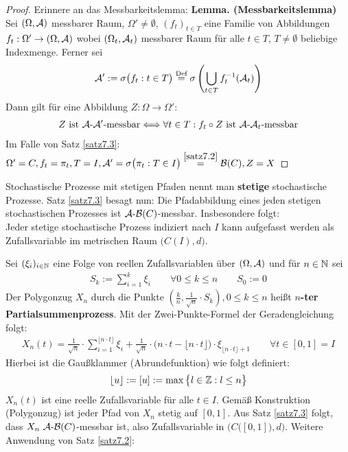 \begin{proof}
	Erinnere an das Messbarkeitslemma:\nl
	\textbf{Lemma. (Messbarkeitslemma)}\\
	Sei $(\Omega,\mathcal{A})$ messbarer Raum, $\Omega'\neq\emptyset$, $(f_t)_{t\in T}$ eine Familie von Abbildungen\\ $f_t:\Omega'\to(\Omega,\mathcal{A})$ wobei $(\Omega_t,\mathcal{A}_t)$ messbarer Raum für alle $t\in T$, $T\neq\emptyset$ beliebige Indexmenge. 
	Ferner sei
	\begin{align*}
		\mathcal{A}':=\sigma\big(f_t:t\in T\big)\stackrel{\text{Def}}{=}\sigma\left(\bigcup\limits_{t\in T} f_t^{-1}(\mathcal{A}_t)\right)
	\end{align*}
	Dann gilt für eine Abbildung $Z:\Omega\to\Omega'$:
	\begin{align*}
		Z\text{ ist }\mathcal{A}\text{-}\mathcal{A}'\text{-messbar}\Longleftrightarrow\forall t\in T: f_t\circ Z\text{ ist }\mathcal{A}\text{-}\mathcal{A}_t\text{-messbar}
	\end{align*}
	Im Falle von Satz \ref{satz7.3}: $\Omega'=C, f_t=\pi_t, T=I,\mathcal{A}'=\sigma\big(\pi_t:T\in I\big)\stackrel{\ref{satz7.2}}{=}\mathcal{B}(C),Z=X$
\end{proof}

Stochastische Prozesse mit stetigen Pfaden nennt man \textbf{stetige} stochastische Prozesse. 
Satz \ref{satz7.3} besagt nun: 
Die Pfadabbildung eines jeden stetigen stochastischen Prozesses ist $\mathcal{A}\text{-}\mathcal{B}(C)$-messbar. 
Insbesondere folgt:\\
Jeder stetige stochastische Prozess indiziert nach $I$ kann aufgefasst werden als Zufallsvariable im metrischen Raum $\big(C(I),d\big)$.

\begin{beispiel}\label{beispiel7.4}
	Sei $(\xi_i)_{i\in\mathbb{N}}$ eine Folge von reellen Zufallsvariablen über $(\Omega,\mathcal{A})$ und für $n\in\mathbb{N}$ sei
	\begin{align*}
		S_k:=\sum\limits_{i=1}^k\xi_i\qquad\forall0\leq k\leq n\qquad S_0:=0
	\end{align*}
	Der Polygonzug $X_n$ durch die Punkte $\left(\frac{k}{n},\frac{1}{\sqrt{n}}\cdot S_k\right),0\leq k\leq n$ heißt \textbf{$n$-ter Partialsummenprozess}.
	Mit der Zwei-Punkte-Formel der Geradengleichung folgt:
	\begin{align*}
		X_n(t)=\frac{1}{\sqrt{n}}\cdot\sum\limits_{i=1}^{\lfloor n\cdot t\rfloor}\xi_i+\frac{1}{\sqrt{n}}\cdot\big(n\cdot t-\lfloor n\cdot t\rfloor\big)\cdot\xi_{\lfloor n\cdot t\rfloor+1}\qquad\forall t\in[0,1]=I
	\end{align*}
	Hierbei ist die Gaußklammer (Abrundefunktion) wie folgt definiert:
	\begin{align*}
		\lfloor u\rfloor:=[u]:=\max\big\lbrace l\in\mathbb{Z}:l\leq n\big\rbrace
	\end{align*}
	$X_n(t)$ ist eine reelle Zufallsvariable für alle $t\in I$. 
	Gemäß Konstruktion (Polygonzug) ist jeder Pfad von $X_n$ stetig auf $[0,1]$. 
	Aus Satz \ref{satz7.3} folgt, dass $X_n~\mathcal{A}\text{-}\mathcal{B}(C)$-messbar ist, also Zufallsvariable in $\Big(C\big([0,1]\big),d\Big)$. 
	Weitere Anwendung von Satz \ref{satz7.2}:
\end{beispiel}

